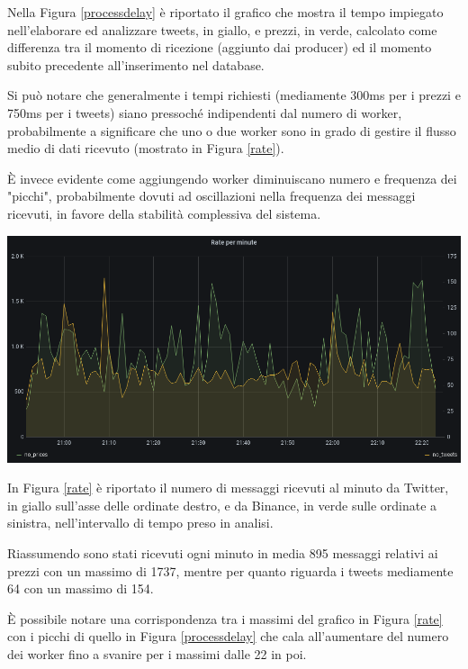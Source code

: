 Nella Figura \ref{processdelay} è riportato il grafico che mostra il tempo impiegato
nell'elaborare ed analizzare tweets, in giallo,
e prezzi, in verde, calcolato come differenza tra il momento di ricezione
(aggiunto dai producer) ed il momento subito precedente all'inserimento nel database.

Si può notare che generalmente i tempi richiesti (mediamente 300ms per i prezzi e 750ms per
i tweets) siano pressoché indipendenti dal numero di worker,
probabilmente a significare che uno o due worker sono in grado di gestire il flusso medio di dati
ricevuto (mostrato in Figura \ref{rate}).

È invece evidente come aggiungendo worker diminuiscano numero e 
frequenza dei "picchi", probabilmente dovuti ad oscillazioni nella frequenza dei messaggi ricevuti,
in favore della stabilità complessiva del sistema.

\begin{center}
    \includegraphics[max width=\linewidth]{rate.png}
    \label{rate}
\end{center}

In Figura \ref{rate} è riportato il numero di messaggi ricevuti al minuto da Twitter, in giallo
sull'asse delle ordinate destro, e da Binance, in verde sulle ordinate a sinistra, nell'intervallo
di tempo preso in analisi.

Riassumendo sono stati ricevuti ogni minuto in media 895 messaggi relativi ai prezzi con un
massimo di 1737, mentre per quanto riguarda i tweets mediamente 64 con un massimo di 154. 

È possibile notare una corrispondenza tra i massimi del grafico in Figura \ref{rate} con i picchi
di quello in Figura \ref{processdelay} che cala all'aumentare del numero dei worker fino
a svanire per i massimi dalle 22 in poi.
